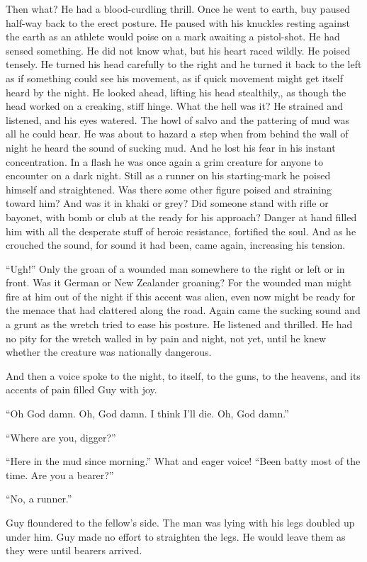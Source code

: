 Then what? He had a blood-curdling thrill. Once he went to earth, buy paused half-way back to the erect posture. He paused with his knuckles resting against the earth as an athlete would poise on a mark awaiting a pistol-shot. He had sensed something. He did not know what, but his heart raced wildly. He poised tensely. He turned his head carefully to the right and he turned it back to the left as if something could see his movement, as if quick movement might get itself heard by the night. He looked ahead, lifting his head stealthily,, as though the head worked on a creaking, stiff hinge. What the hell was it? He strained and listened, and his eyes watered. The howl of salvo and the pattering of mud was all he could hear. He was about to hazard a step when from behind the wall of night he heard the sound of sucking mud. And he lost his fear in his instant concentration. In a flash he was once again a grim creature for anyone to encounter on a dark night. Still as a runner on his starting-mark he poised himself and straightened. Was there some other figure poised and straining toward him? And was it in khaki or grey? Did someone stand with rifle or bayonet, with bomb or club at the ready for his approach? Danger at hand filled him with all the desperate stuff of heroic resistance, fortified the soul. And as he crouched the sound, for sound it had been, came again, increasing his tension.

``Ugh!'' Only the groan of a wounded man somewhere to the right or left or in front. Was it German or New Zealander groaning? For the wounded man might fire at him out of the night if this accent was alien, even now might be ready for the menace that had clattered along the road. Again came the sucking sound and a grunt as the wretch tried to ease his posture. He listened and thrilled. He had no pity for the wretch walled in by pain and night, not yet, until he knew whether the creature was nationally dangerous.

And then a voice spoke to the night, to itself, to the guns, to the heavens, and its accents of pain filled Guy with joy.

``Oh God damn. Oh, God damn. I think I'll die. Oh, God damn.''

``Where are you, digger?''

``Here in the mud since morning.'' What and eager voice! ``Been batty most of the time. Are you a bearer?''

``No, a runner.''

Guy floundered to the fellow's side. The man was lying with his legs doubled up under him. Guy made no effort to straighten the legs. He would leave them as they were until bearers arrived.

